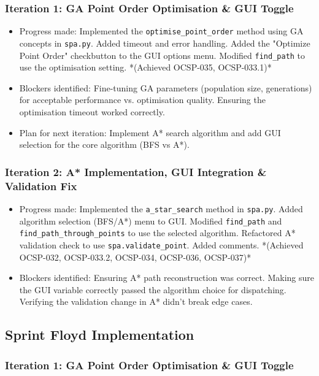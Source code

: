 \subsubsection{Iteration 1: GA Point Order Optimisation \& GUI Toggle}
\begin{itemize}
	\item Progress made: Implemented the \verb|optimise_point_order| method using GA concepts in \verb|spa.py|. Added timeout and error handling. Added the "Optimize Point Order" checkbutton to the GUI options menu. Modified \verb|find_path| to use the optimisation setting. *(Achieved OCSP-035, OCSP-033.1)*
	\item Blockers identified: Fine-tuning GA parameters (population size, generations) for acceptable performance vs. optimisation quality. Ensuring the optimisation timeout worked correctly.
	\item Plan for next iteration: Implement A* search algorithm and add GUI selection for the core algorithm (BFS vs A*).
\end{itemize}

\subsubsection{Iteration 2: A* Implementation, GUI Integration \& Validation Fix}
\begin{itemize}
	\item Progress made: Implemented the \verb|a_star_search| method in \verb|spa.py|. Added algorithm selection (BFS/A*) menu to GUI. Modified \verb|find_path| and \verb|find_path_through_points| to use the selected algorithm. Refactored A* validation check to use \verb|spa.validate_point|. Added comments. *(Achieved OCSP-032, OCSP-033.2, OCSP-034, OCSP-036, OCSP-037)*
	\item Blockers identified: Ensuring A* path reconstruction was correct. Making sure the GUI variable correctly passed the algorithm choice for dispatching. Verifying the validation change in A* didn't break edge cases.
\end{itemize}

\subsection{Sprint Floyd Implementation}

\subsubsection{Iteration 1: GA Point Order Optimisation \& GUI Toggle}

